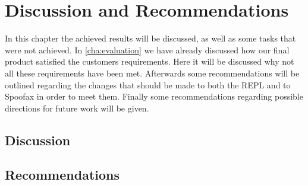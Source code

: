 \chapter{Discussion and Recommendations}
\label{cha:disc-recomm}

In this chapter the achieved results will be discussed, as well as some tasks
that were not achieved. In \cref{cha:evaluation} we have already discussed how
our final product satisfied the customers requirements. Here it will be
discussed why not all these requirements have been met. Afterwards some
recommendations will be outlined regarding the changes that should be made to
both the REPL and to Spoofax in order to meet them. Finally some
recommendations regarding possible directions for future work will be given.

\section{Discussion}
\label{sec:discuss-discussion}



\section{Recommendations}
\label{sec:discuss-future}



